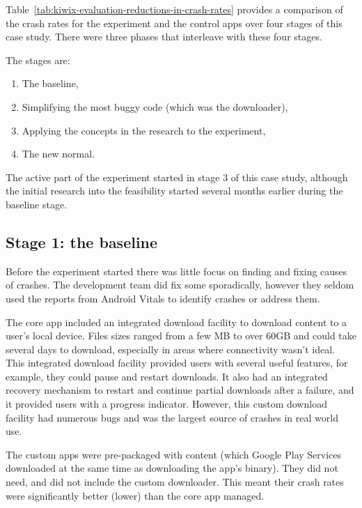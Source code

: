 Table~\ref{tab:kiwix-evaluation-reductions-in-crash-rates} provides a comparison of the crash rates for the experiment and the control apps over four stages of this case study. There were three phases that interleave with these four stages.

The stages are:
\begin{enumerate}
    \itemsep0em
    \item The baseline,
    \item Simplifying the most buggy code (which was the downloader),
    \item Applying the concepts in the research to the experiment,
    \item The new normal.
\end{enumerate}

The active part of the experiment started in stage 3 of this case study, although the initial research into the feasibility started several months earlier during the baseline stage.

\subsection{Stage 1: the baseline}
Before the experiment started there was little focus on finding and fixing causes of crashes. The development team did fix some sporadically, however they seldom used the reports from Android Vitals to identify crashes or address them.

The core app included an integrated download facility to download content to a user's local device. Files sizes ranged from a few MB to over 60GB and could take several days to download, especially in areas where connectivity wasn't ideal.  This integrated download facility provided users with several useful features, for example, they could pause and restart downloads. It also had an integrated recovery mechanism to restart and continue partial downloads after a failure, and it provided users with a progress indicator. However, this custom download facility had numerous bugs and was the largest source of crashes in real world use.

The custom apps were pre-packaged with content (which Google Play Services downloaded at the same time as downloading the app's binary). They did not need, and did not include the custom downloader. This meant their crash rates were significantly better (lower) than the core app managed.

